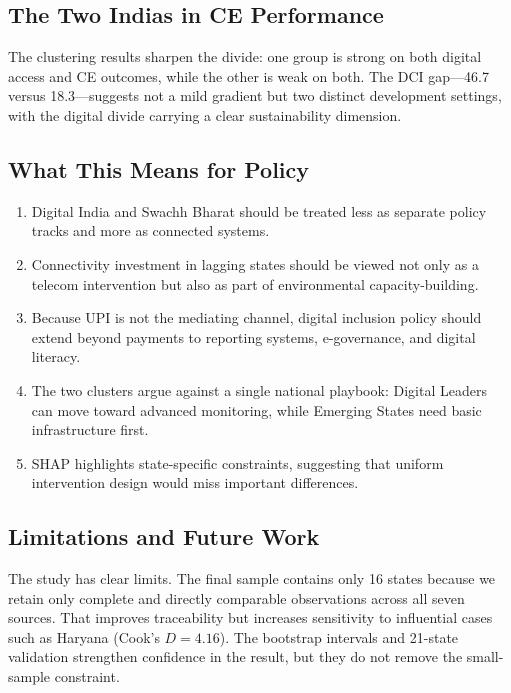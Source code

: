 \documentclass[conference]{IEEEtran}
\begin{document}
\subsection{The Two Indias in CE Performance}

The clustering results sharpen the divide: one group is strong on both digital access and CE outcomes, while the other is weak on both. The DCI gap---46.7 versus 18.3---suggests not a mild gradient but two distinct development settings, with the digital divide carrying a clear sustainability dimension.

\subsection{What This Means for Policy}

\begin{enumerate}
    \item Digital India and Swachh Bharat should be treated less as separate policy tracks and more as connected systems.
    \item Connectivity investment in lagging states should be viewed not only as a telecom intervention but also as part of environmental capacity-building.
    \item Because UPI is not the mediating channel, digital inclusion policy should extend beyond payments to reporting systems, e-governance, and digital literacy.
    \item The two clusters argue against a single national playbook: Digital Leaders can move toward advanced monitoring, while Emerging States need basic infrastructure first.
    \item SHAP highlights state-specific constraints, suggesting that uniform intervention design would miss important differences.
\end{enumerate}

\subsection{Limitations and Future Work}

The study has clear limits. The final sample contains only 16 states because we retain only complete and directly comparable observations across all seven sources. That improves traceability but increases sensitivity to influential cases such as Haryana (Cook's $D = 4.16$). The bootstrap intervals and 21-state validation strengthen confidence in the result, but they do not remove the small-sample constraint.
\end{document}
